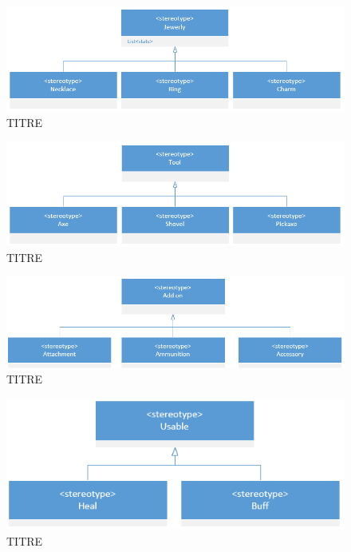 \begin{figure}[H]
    \centering
    \includegraphics[width=14cm]{10_img/chap5/01_01_03_jewerly.PNG} 
    \caption{TITRE}
\end{figure}
\begin{figure}[H]
    \centering
    \includegraphics[width=14cm]{10_img/chap5/01_01_04_tool.PNG} 
    \caption{TITRE}
\end{figure}
\begin{figure}[H]
    \centering
    \includegraphics[width=14cm]{10_img/chap5/01_03_addon.PNG} 
    \caption{TITRE}
\end{figure}
\begin{figure}[H]
    \centering
    \includegraphics[width=14cm]{10_img/chap5/01_04_usable.PNG} 
    \caption{TITRE}
\end{figure}
